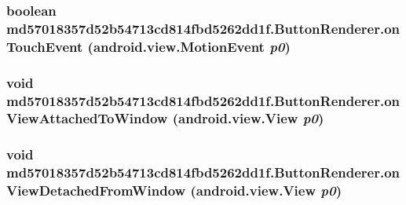 \hypertarget{classmd57018357d52b54713cd814fbd5262dd1f_1_1_button_renderer_8c6de4a7b4de358182be7eb07060dd03}{
\subsubsection[{onTouchEvent}]{\setlength{\rightskip}{0pt plus 5cm}boolean md57018357d52b54713cd814fbd5262dd1f.ButtonRenderer.onTouchEvent (android.view.MotionEvent {\em p0})}}
\label{classmd57018357d52b54713cd814fbd5262dd1f_1_1_button_renderer_8c6de4a7b4de358182be7eb07060dd03}


\hypertarget{classmd57018357d52b54713cd814fbd5262dd1f_1_1_button_renderer_1251093a49d0864f526d797ee9794583}{
\subsubsection[{onViewAttachedToWindow}]{\setlength{\rightskip}{0pt plus 5cm}void md57018357d52b54713cd814fbd5262dd1f.ButtonRenderer.onViewAttachedToWindow (android.view.View {\em p0})}}
\label{classmd57018357d52b54713cd814fbd5262dd1f_1_1_button_renderer_1251093a49d0864f526d797ee9794583}


\hypertarget{classmd57018357d52b54713cd814fbd5262dd1f_1_1_button_renderer_5ac1b7c1483240a116c3722b71146f75}{
\subsubsection[{onViewDetachedFromWindow}]{\setlength{\rightskip}{0pt plus 5cm}void md57018357d52b54713cd814fbd5262dd1f.ButtonRenderer.onViewDetachedFromWindow (android.view.View {\em p0})}}
\label{classmd57018357d52b54713cd814fbd5262dd1f_1_1_button_renderer_5ac1b7c1483240a116c3722b71146f75}




